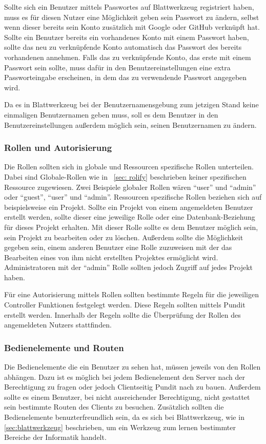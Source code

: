 \documentclass[paper=a4,fontsize=12pt,parskip=half]{scrartcl}
\begin{document}
	Sollte sich ein Benutzer mittels Passwortes auf Blattwerkzeug registriert haben, muss es für diesen Nutzer eine Möglichkeit geben sein Passwort zu ändern, selbst wenn dieser bereits sein Konto zusätzlich mit Google oder GitHub verknüpft hat. Sollte ein Benutzer bereits ein vorhandenes Konto mit einem Passwort haben, sollte das neu zu verknüpfende Konto automatisch das Passwort des bereits vorhandenen annehmen. Falls das zu verknüpfende Konto, das erste mit einem Passwort sein sollte, muss dafür in den Benutzereinstellungen eine extra Passworteingabe erscheinen, in dem das zu verwendende Passwort angegeben wird.

	Da es in Blattwerkzeug bei der Benutzernamensgebung zum jetzigen Stand keine einmaligen Benutzernamen geben muss, soll es dem Benutzer in den Benutzereinstellungen außerdem möglich sein, seinen Benutzernamen zu ändern.

	\subsubsection{Rollen und Autorisierung}
	Die Rollen sollten sich in globale und Ressourcen spezifische Rollen unterteilen. Dabei sind Globale-Rollen wie in ~\ref{sec: rolify} beschrieben keiner spezifischen Ressource zugewiesen. Zwei Beispiele globaler Rollen wären \enquote{user} und \enquote{admin} oder \enquote{guest}, \enquote{user} und \enquote{admin}. Ressourcen spezifische Rollen beziehen sich auf beispielsweise ein Projekt. Sollte ein Projekt von einem angemeldeten Benutzer erstellt werden, sollte dieser eine jeweilige Rolle oder eine Datenbank-Beziehung für dieses Projekt erhalten. Mit dieser Rolle sollte es dem Benutzer möglich sein, sein Projekt zu bearbeiten oder zu löschen. Außerdem sollte die Möglichkeit gegeben sein, einem anderen Benutzer eine Rolle zuzuweisen mit der das Bearbeiten eines von ihm nicht erstellten Projektes ermöglicht wird. Administratoren mit der \enquote{admin} Rolle sollten jedoch Zugriff auf jedes Projekt haben.


	Für eine Autorisierung mittels Rollen sollten bestimmte Regeln für die jeweiligen Controller Funktionen festgelegt werden. Diese Regeln sollten mittels Pundit erstellt werden. Innerhalb der Regeln sollte die Überprüfung der Rollen des angemeldeten Nutzers stattfinden.



	\subsubsection{Bedienelemente und Routen}
	Die Bedienelemente die ein Benutzer zu sehen hat, müssen jeweils von den Rollen abhängen. Dazu ist es möglich bei jedem Bedienelement den Server nach der Berechtigung zu fragen oder jedoch Clientseitig Pundit nach zu bauen. Außerdem sollte es einem Benutzer, bei nicht ausreichender Berechtigung, nicht gestattet sein bestimmte Routen des Clients zu besuchen. Zusätzlich sollten die Bedienelemente benuzterfreundlich sein, da es sich bei Blattwerkzeug, wie in \ref{sec:blattwerkzeug} beschrieben, um ein Werkzeug zum lernen bestimmter Bereiche der Informatik handelt.
\end{document}
